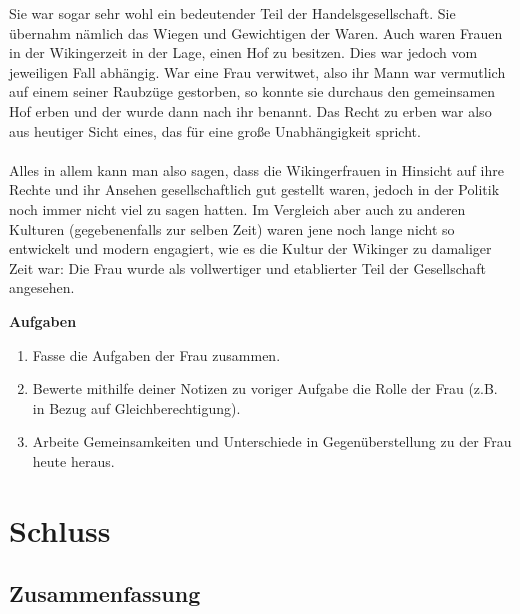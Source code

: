 \documentclass[12pt,a4paper,ngerman,openany]{book}
\newcommand{\aufgaben}[1]{
  \begin{tcolorbox}
    \textbf{Aufgaben}
    \begin{enumerate}
      #1
    \end{enumerate}
  \end{tcolorbox}
} %
\newcommand{\fchapter}[1]{\chapter{#1}\thispagestyle{chapterstyle}}
\begin{document}
Sie war sogar sehr wohl ein bedeutender Teil der Handelsgesellschaft. Sie übernahm nämlich das Wiegen und Gewichtigen der Waren. 
Auch waren Frauen in der Wikingerzeit in der Lage, einen Hof zu besitzen. Dies war jedoch vom jeweiligen Fall abhängig. War eine Frau verwitwet, also ihr Mann war vermutlich auf einem seiner Raubzüge gestorben, so konnte sie durchaus den gemeinsamen Hof erben und der wurde dann nach ihr benannt. Das Recht zu erben war also aus heutiger Sicht eines, das für eine große Unabhängigkeit spricht.\\\\
Alles in allem kann man also sagen, dass die Wikingerfrauen in Hinsicht auf ihre Rechte und ihr Ansehen gesellschaftlich gut gestellt waren, jedoch in der Politik noch immer nicht viel zu sagen hatten. Im Vergleich aber auch zu anderen Kulturen (gegebenenfalls zur selben Zeit) waren jene noch lange nicht so entwickelt und modern engagiert, wie es die Kultur der Wikinger zu damaliger Zeit war:
Die Frau wurde als vollwertiger und etablierter Teil der Gesellschaft angesehen.

\aufgaben{
  \item Fasse die Aufgaben der Frau zusammen.
  \item Bewerte mithilfe deiner Notizen zu voriger Aufgabe die Rolle der Frau (z.B. in Bezug auf Gleichberechtigung).
  \item Arbeite Gemeinsamkeiten und Unterschiede in Gegenüberstellung zu der Frau heute heraus.
}

\fchapter{Schluss}

\section{Zusammenfassung}

\end{document}

